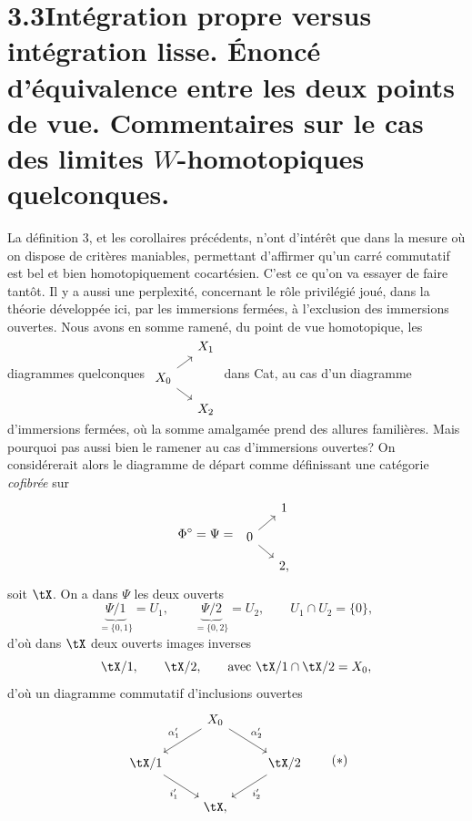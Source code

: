 \section*{3.3\quad Intégration propre versus intégration lisse. Énoncé d'équivalence entre les deux points de vue. Commentaires sur le cas des limites $W$-homotopiques quelconques.}

La définition 3, et les corollaires précédents, n'ont d'intérêt que dans la mesure où on dispose de critères maniables, permettant d'affirmer qu'un carré commutatif est bel et bien homotopiquement cocartésien. C'est ce qu'on va essayer de faire tantôt. Il y a aussi une perplexité, concernant le rôle privilégié joué, dans la théorie développée ici, par les immersions fermées, à l'exclusion des immersions ouvertes. Nous avons en somme ramené, du
point de vue homotopique, les diagrammes quelconques $\begin{tikzcd}[row sep=small, column sep=small]
 & X_1 \\
X_0 \arrow[ur] \arrow[dr] & \\
 & X_2
\end{tikzcd}$ dans Cat, au cas d'un diagramme d'immersions fermées, où la somme amalgamée prend des allures familières. Mais pourquoi pas aussi bien le ramener au cas d'immersions ouvertes? On considérerait alors le diagramme de départ comme définissant une catégorie \textit{cofibrée} sur
\[
\Phi^{\circ} = \Psi = \
\begin{tikzcd}[row sep=small, column sep=small]
 & 1 \\
0 \arrow[ur] \arrow[dr] & \\
 & 2,
\end{tikzcd}
\]
soit $\tX$. On a dans $\Psi$ les deux ouverts
\[
\underbrace{\Psi/1}_{=\{0,1\}} = U_1, \qquad \underbrace{\Psi/2}_{=\{0,2\}} = U_2, \qquad U_1 \cap U_2 = \{0\},
\]
d'où dans $\tX$ deux ouverts images inverses
\[
\tX/1, \qquad \tX/2, \qquad \text{avec } \tX/1 \cap \tX/2 = X_0,
\]
d'où un diagramme commutatif d'inclusions ouvertes
\[
\begin{tikzcd}
 & X_0 \arrow[dl, "\alpha'_1"'] \arrow[dr, "\alpha'_2"] & \\
\tX/1 \arrow[dr, "i'_1"'] & & \tX/2 \arrow[dl, "i'_2"] \\
 & \tX, &
\end{tikzcd}
\tag*{$(*)$}
\]

